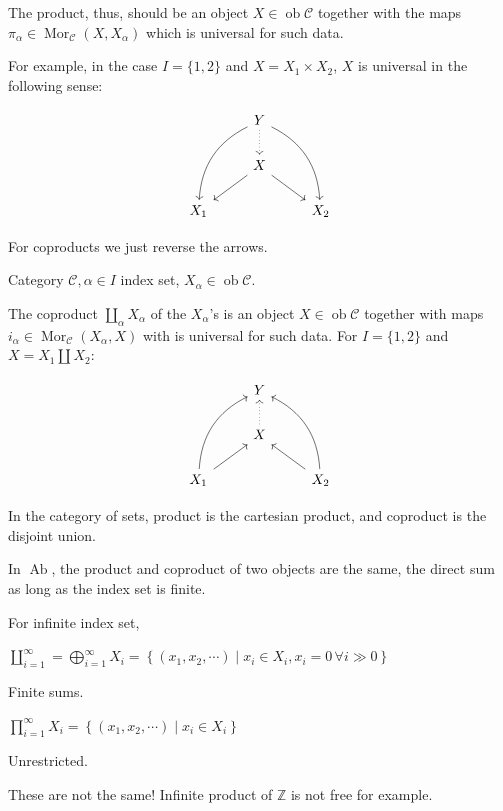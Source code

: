 \documentclass{article}
\theoremstyle{definition}
\begin{document}
    The product, thus, should be an object \(X\in \operatorname{ob} \mathcal{C}\) together with the maps \(\pi_\alpha \in \operatorname{Mor}_{\mathcal{C}} (X,X_\alpha)\) which is universal for such data.

    For example, in the case \(I = \{ 1,2 \}\) and \(X = X_1 \times X_2\), \(X\) is universal in the following sense:

    \[
        \begin{tikzcd}
            & Y \ar[ldd, bend right] \ar[rdd, bend left] \ar[d, dotted] \\ & X \ar[ld] \ar[rd] \\ X_1 & & X_2
        \end{tikzcd}
    \]

    For coproducts we just reverse the arrows.

    Category \(\mathcal{C}, \alpha \in I\) index set, \(X_\alpha \in \operatorname{ob} \mathcal{C}\).
    
    The coproduct \(\coprod_\alpha X_\alpha\) of the \(X_\alpha\)'s is an object \(X\in \operatorname{ob} \mathcal{C}\) together with maps \(i_\alpha \in \operatorname{Mor}_{\mathcal{C}} (X_\alpha , X)\) with is universal for such data. For \(I = \{ 1,2 \}\) and \(X = X_1 \coprod X_2\):

    \[
        \begin{tikzcd}
            & Y & \\ & X \ar[u, dotted] \\ X_1 \ar[uur, bend left] \ar[ur] & & X_2 \ar[uul, bend right] \ar[ul]
        \end{tikzcd}
    \]

    In the category of sets, product is the cartesian product, and coproduct is the disjoint union.

    In \(\operatorname{Ab}\), the product and coproduct of two objects are the same, the direct sum as long as the index set is finite.

    For infinite index set,

    \(\coprod_{i=1}^{\infty} = \bigoplus_{i=1}^{\infty} X_i = \left\{ (x_1, x_2, \cdots ) \mid x_i \in X_i, x_i = 0 \, \forall i \gg 0 \right\}\)
    
    Finite sums.

    \(\prod_{i=1}^{\infty} X_i = \left\{ (x_1, x_2, \cdots ) \mid x_i\in X_i \right\} \)
    
    Unrestricted.

    These are not the same! Infinite product of \(\mathbb{Z}\) is not free for example.
\end{document}
